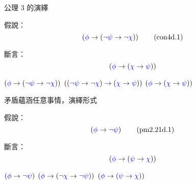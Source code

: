 \documentclass{Slideshow}
\begin{document}
\begin{frame}{公理 3 的演繹}
    \begin{theorem}
        \newcommand{\hyp}{\wi\wph{\wi{\wn\wps}{\wn\wch}}}

        假說：
        \[ \hyp \tag{con4d.1} \]

        斷言：
        \[ \wi\wph{\wi\wch\wps} \]

        \begin{mmproof}
            \begin{mmtable}{2em}{4em}
                    $\hyp$
                    \label{con4d:1}
                    $\axIII\wps\wch$
                    \label{con4d:ax-3}
                    $\wi\wph{\wi\wch\wps}$
            \end{mmtable}
        \end{mmproof}
    \end{theorem}
\end{frame}

\begin{frame}{矛盾蘊涵任意事情，演繹形式}
    \begin{theorem}[\mmtarget{pm2.21d}]
        假說：
        \[ \wi\wph{\wn\wps} \tag{pm2.21d.1} \]

        斷言：
        \[ \wi\wph{\wi\wps\wch} \]

        \begin{mmproof}
            \begin{mmtable}{1em}{5em}
                    $\wi\wph{\wn\wps}$
                    \label{pm2.21d:1}
                    $\wi\wph{\wi{\wn\wch}{\wn\wps}}$
                    \label{pm2.21d:a1d}
                    $\wi\wph{\wi\wps\wch}$
            \end{mmtable}
        \end{mmproof}
    \end{theorem}
\end{frame}
\end{document}
